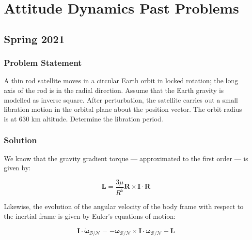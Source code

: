\newcommand{\vif}[2]{\boldsymbol{#1}_\mathcal{#2}}
\newcommand{\dvif}[2]{\dv{#1}_\mathcal{#2}}
\newcommand{\v}[1]{\boldsymbol{#1}}
\newcommand{\dv}[1]{\dot{\v{#1}}}
\newcommand{\ddv}[1]{\ddot{\v{#1}}}
\newcommand{\uv}[1]{\hat{\v{#1}}}

\newcommand{\q}{\v{q}}
\newcommand{\qb}{\bar{\v{q}}}
\newcommand{\qbb}{\bar{\bar{\v{q}}}}




\maketitle

\section{Attitude Dynamics Past Problems}

\subsection{Spring 2021}

\subsubsection{Problem Statement}

A thin rod satellite moves in a circular Earth orbit in locked rotation; the long axis of the rod is in the radial direction. Assume that the Earth gravity is modelled as inverse square. After perturbation, the satellite carries out a small libration motion in the orbital plane about the position vector. The orbit radius is at $630$ km altitude. Determine the libration period.

\subsubsection{Solution}

We know that the gravity gradient torque --- approximated to the first order --- is given by:

\begin{equation}
    \v{L} = \frac{3\mu}{R^5} \v{R} \times \v{I} \cdot \v{R}
\end{equation}

Likewise, the evolution of the angular velocity of the body frame with respect to the inertial frame is given by Euler's equations of motion:

\begin{equation}
    \v{I} \cdot \dvif{\omega}{B/N} = -\vif{\omega}{B/N} \times \v{I} \cdot \vif{\omega}{B/N} + \v{L}
\end{equation}

